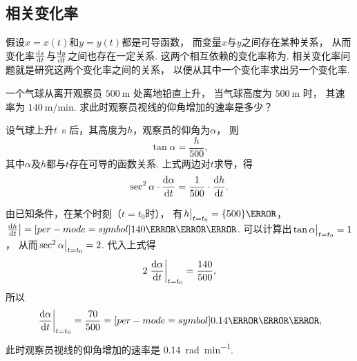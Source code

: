 \subsection{相关变化率}
假设\(x=x(t)\)和\(y=y(t)\)都是可导函数，
而变量\(x\)与\(y\)之间存在某种关系，
从而变化率\(\dv{x}{t}\)与\(\dv{y}{t}\)之间也存在一定关系.
这两个相互依赖的变化率称为.
相关变化率问题就是研究这两个变化率之间的关系，
以便从其中一个变化率求出另一个变化率.

\begin{example}
一个气球从离开观察员 $\qty{500}{\meter}$ 处离地铅直上升，
当气球高度为 $\qty{500}{\meter}$ 时，
其速率为 $\qty[per-mode=symbol]{140}{\meter\per\minute}$.
求此时观察员视线的仰角增加的速率是多少？
\begin{solution}
设气球上升\(t\)~\unit{\second} 后，其高度为\(h\)，观察员的仰角为\(\alpha\)，
则\[
	\tan\alpha=\frac{h}{500},
\]
其中\(\alpha\)及\(h\)都与\(t\)存在可导的函数关系.
上式两边对\(t\)求导，得\[
	\sec^2\alpha \cdot \dv{\alpha}{t}
	= \frac1{500} \cdot \dv{h}{t}.
\]

由已知条件，在某个时刻（\(t=t_0\)时），
有\(\eval{h}_{t=t_0}=\qty{500}{\meter}\)，
\(\eval{\dv{h}{t}}=\qty[per-mode=symbol]{140}{\meter\per\minute}\).
可以计算出\(\eval{\tan\alpha}_{t=t_0}=1\)，
从而\(\eval{\sec^2\alpha}_{t=t_0}=2\).
代入上式得\[
	2 \eval{\dv{\alpha}{t}}_{t=t_0} = \frac{140}{500},
\]
所以\[
	\eval{\dv{\alpha}{t}}_{t=t_0} = \frac{70}{500}
	= \qty[per-mode=symbol]{0.14}{\radian\per\minute},
\]
此时观察员视线的仰角增加的速率是 \qty[per-mode=symbol]{0.14}{\radian\per\minute}.
\end{solution}
\end{example}
